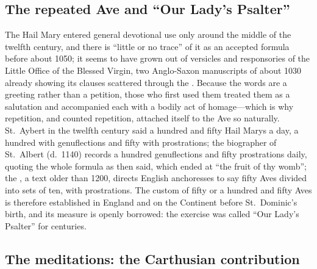 \subsection{The repeated Ave and ``Our Lady's Psalter''}

The Hail Mary entered general devotional use only around the middle of
the twelfth century, and there is ``little or no trace'' of it as an
accepted formula before about 1050; it seems to have grown out of
versicles and responsories of the Little Office of the Blessed Virgin,
two Anglo-Saxon manuscripts of about 1030 already showing its clauses
scattered through the . Because the words are a greeting
rather than a petition, those who first used them treated them as a
salutation and accompanied each with a bodily act of homage---which is
why repetition, and counted repetition, attached itself to the Ave so
naturally. St.~Aybert in the twelfth century said a hundred and fifty
Hail Marys a day, a hundred with genuflections and fifty with
prostrations; the biographer of St.~Albert (d.~1140) records a hundred
genuflections and fifty prostrations daily, quoting the whole formula as
then said, which ended at ``the fruit of thy womb''; the
, a text older than 1200, directs English anchoresses
to say fifty Aves divided into sets of ten, with prostrations. The
custom of fifty or a hundred and fifty Aves is therefore established in
England and on the Continent before St.~Dominic's birth, and its measure
is openly borrowed: the exercise was called ``Our Lady's Psalter'' for
centuries.

\subsection{The meditations: the Carthusian contribution}


